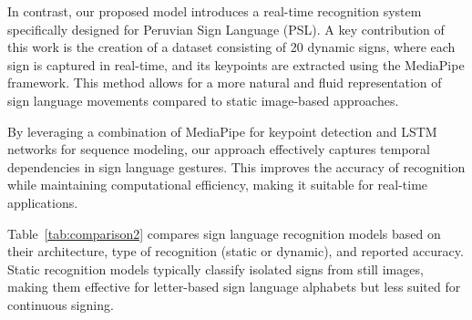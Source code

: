 \documentclass[preprint,12pt,authoryear]{elsarticle}
\begin{document}
In contrast, our proposed model introduces a real-time recognition system specifically designed for Peruvian Sign Language (PSL). A key contribution of this work is the creation of a dataset consisting of 20 dynamic signs, where each sign is captured in real-time, and its keypoints are extracted using the MediaPipe framework. This method allows for a more natural and fluid representation of sign language movements compared to static image-based approaches.

By leveraging a combination of MediaPipe for keypoint detection and LSTM networks for sequence modeling, our approach effectively captures temporal dependencies in sign language gestures. This improves the accuracy of recognition while maintaining computational efficiency, making it suitable for real-time applications.



\begin{table}[H]
    \centering
    \caption{Comparative analysis of sign language recognition models based on architecture and dataset characteristics.}
    \label{tab:comparison}
\end{table}



Table~\ref{tab:comparison2} compares sign language recognition models based on their architecture, type of recognition (static or dynamic), and reported accuracy. Static recognition models typically classify isolated signs from still images, making them effective for letter-based sign language alphabets but less suited for continuous signing. 
\end{document}
